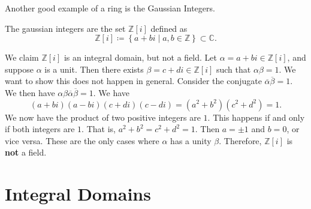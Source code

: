 Another good example of a ring is the Gaussian Integers.
\begin{definition}\label{dfn:GI}
	The gaussian integers are the set $\mathbb{Z}[i]$ defined as
	\[
		\mathbb{Z}[i]\coloneqq \left\{ a+bi \mid a,b\in\mathbb{Z} \right\} \subset \mathbb{C}
	.\]
\end{definition}
We claim $\mathbb{Z}[i]$ is an integral domain, but not a field. Let $\alpha =a+bi\in\mathbb{Z}\left[ i \right] $, and suppose $\alpha $ is a unit. Then there exists $\beta =c+di\in\mathbb{Z}[i]$ such that $\alpha \beta =1$. We want to show this does not happen in general. Consider the conjugate $\overline{\alpha} \overline{\beta } =1$. We then have $\alpha \beta \overline{\alpha } \overline{\beta } =1$. We have
\[
	\left( a+bi \right) \left( a-bi \right) \left( c+di \right) \left( c-di \right) =\left( a^2+b^2 \right) \left( c^2+d^2 \right) =1
.\]
We now have the product of two positive integers are $1$. This happens if and only if both integers are $1$. That is, $a^2+b^2=c^2+d^2=1$. Then $a=\pm1$ and $b=0$, or vice versa. These are the only cases where $\alpha $ has a unity $\beta $. Therefore, $\mathbb{Z}[i]$ is \textbf{not} a field.
\chapter{Integral Domains}
